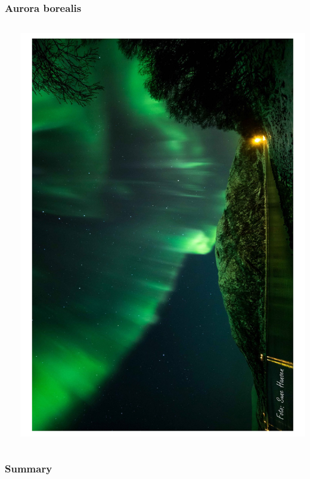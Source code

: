 \documentclass[mathserif,10pt]{beamer}
\begin{document}
\begin{frame}
    \frametitle{Aurora borealis}
    \begin{columns}
    \begin{column}{.50\textwidth}
	\ \\
    \end{column}
    \begin{column}{.50\textwidth}
	\centering
	\includegraphics[viewport = 0 0 600 800, clip, scale=0.15, angle = -90]{figures/aurora.pdf}
    \end{column}
    \end{columns}
\end{frame}

\begin{frame}
    \frametitle{Summary}
\end{frame}
\end{document}
